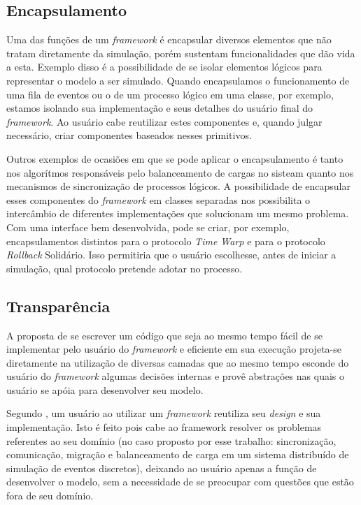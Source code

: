 \subsection{Encapsulamento}

Uma das funções de um \textit{framework} é encapsular diversos elementos que não tratam diretamente da simulação, porém sustentam funcionalidades que dão vida a esta. Exemplo disso é a possibilidade de se isolar elementos lógicos para representar o modelo a ser simulado. Quando encapsulamos o funcionamento de uma fila de eventos ou o de um processo lógico em uma classe, por exemplo, estamos isolando sua implementação e seus detalhes do usuário final do \textit{framework}. Ao usuário cabe reutilizar estes componentes e, quando julgar necessário, criar componentes baseados nesses primitivos.

Outros exemplos de ocasiões em que se pode aplicar o encapsulamento é tanto nos algorítmos responsáveis pelo balanceamento de cargas no sisteam quanto nos mecanismos de sincronização de processos lógicos. A possibilidade de encapsular esses componentes do \textit{framework} em classes separadas nos possibilita o intercâmbio de diferentes implementações que solucionam um mesmo problema. Com uma interface bem desenvolvida, pode se criar, por exemplo, encapsulamentos distintos para o protocolo \textit{Time Warp} e para o protocolo \textit{Rollback} Solidário. Isso permitiria que o usuário escolhesse, antes de iniciar a simulação, qual protocolo pretende adotar no processo.

\subsection{Transparência}

A proposta de se escrever um código que seja ao mesmo tempo fácil de se implementar pelo usuário do \textit{framework} e eficiente em sua execução projeta-se diretamente na utilização de diversas camadas que ao mesmo tempo esconde do usuário do \textit{framework} algumas decisões internas e provê abstrações nas quais o usuário se apóia para desenvolver seu modelo.

Segundo \cite{DIRK00}, um usuário ao utilizar um \textit{framework} reutiliza seu \textit{design} e sua implementação. Isto é feito pois cabe ao framework resolver os problemas referentes ao seu domínio (no caso proposto por esse trabalho: sincronização, comunicação, migração e balanceamento de carga em um sistema distribuído de simulação de eventos discretos), deixando ao usuário apenas a função de desenvolver o modelo, sem a necessidade de se preocupar com questões que estão fora de seu domínio.

